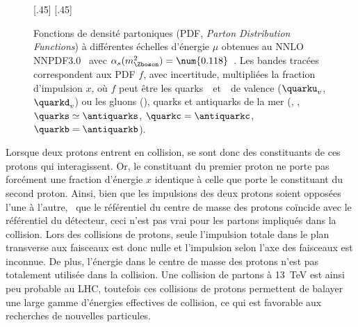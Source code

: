 \begin{figure}[h]
\centering
{}[.45\textwidth]
{}
\hfill
{}[.45\textwidth]
{}
\caption[Fonctions de densité partoniques.]{Fonctions de densité partoniques (PDF, \emph{Parton Distribution Functions}) à différentes échelles d'énergie $\mu$ obtenues au NNLO NNPDF3.0~\cite{NNPDF30} avec $\alpha_s(m_{\Zboson}^2)=\num{0.118}$~\cite{PDG_booklet_2020}. Les bandes tracées correspondent aux PDF $f$, avec incertitude, multipliées la fraction d'impulsion $x$, où $f$ peut être les quarks~\quarku\ et~\quarkd\ de valence ($\quarku_v$, $\quarkd_v$) ou les gluons (\gluon), quarks et antiquarks de la mer (\antiquarku, \antiquarkd, $\quarks\simeq\antiquarks$, $\quarkc=\antiquarkc$, $\quarkb=\antiquarkb$).}
\label{fig-proton_PDFs}
\end{figure}
\par Lorsque deux protons entrent en collision, se sont donc des constituants de ces protons qui interagissent.
Or, le constituant du premier proton ne porte pas forcément une fraction d'énergie $x$ identique à celle que porte le constituant du second proton.
Ainsi, bien que les impulsions des deux protons soient opposées l'une à l'autre, \ie\ que le référentiel du centre de masse des protons coïncide avec le référentiel du détecteur, ceci n'est pas vrai pour les partons impliqués dans la collision.
Lors des collisions de protons, seule l'impulsion totale dans le plan transverse aux faisceaux est donc nulle et l'impulsion selon l'axe des faisceaux est inconnue.
De plus, l'énergie dans le centre de masse des protons n'est pas totalement utilisée dans la collision.
Une collision de partons à \SI{13}{\TeV} est ainsi peu probable au LHC, toutefois ces collisions de protons permettent de balayer une large gamme d'énergies effectives de collision, ce qui est favorable aux recherches de nouvelles particules.
